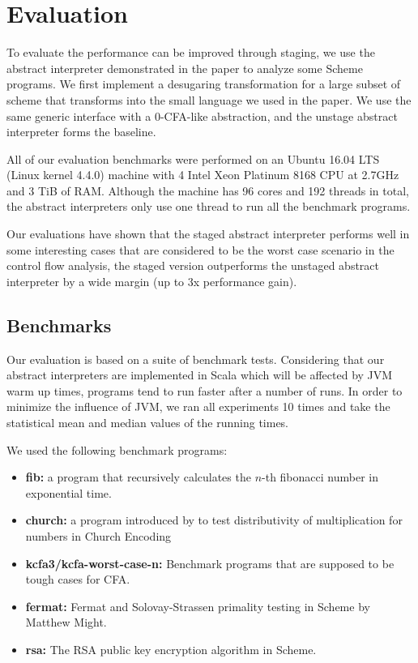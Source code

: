 \section{Evaluation} \label{evaluation}

To evaluate the performance can be improved through staging, we use the abstract
interpreter demonstrated in the paper to analyze some Scheme programs. We first implement
a desugaring transformation for a large subset of scheme that transforms into the
small language we used in the paper.
We use the same generic interface with a 0-CFA-like abstraction, and the unstage abstract
interpreter forms the baseline.

All of our evaluation benchmarks were performed on an Ubuntu 16.04 LTS (Linux kernel 4.4.0)
machine with 4 Intel Xeon Platinum 8168 CPU at 2.7GHz and 3 TiB of RAM.
Although the machine has 96 cores and 192 threads in total,
the abstract interpreters only use one thread to run all the benchmark programs.

Our evaluations have shown that the staged abstract interpreter performs well in some
interesting cases that are considered to be the worst case scenario in the control flow
analysis, the staged version outperforms the unstaged abstract interpreter by a wide
margin (up to 3x performance gain).

\subsection{Benchmarks}

Our evaluation is based on a suite of benchmark tests. Considering that our abstract 
interpreters are implemented in Scala which will be affected by JVM warm up times, programs
tend to run faster after a number of runs. In order to minimize the influence of JVM, 
we ran all experiments 10 times and take the statistical mean and median values of 
the running times.

We used the following benchmark programs:
\begin{itemize}
    \item \textbf{fib:} a program that recursively calculates the $n$-th fibonacci number in
        exponential time.
    \item \textbf{church:} a program introduced by  to test distributivity of multiplication for numbers in Church Encoding 
    \item \textbf{kcfa3/kcfa-worst-case-n:} Benchmark programs that are supposed to
      be tough cases for CFA.
    \item \textbf{fermat:} Fermat and Solovay-Strassen primality testing in Scheme by
      Matthew Might.
    \item \textbf{rsa:} The RSA public key encryption algorithm in Scheme.
\end{itemize}

